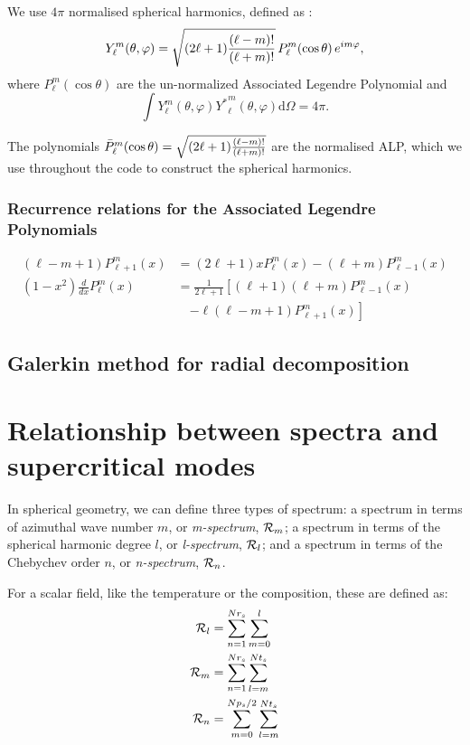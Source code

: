 \documentclass[a4paper,10pt]{book}
\begin{document}
We use $4\pi$ normalised spherical harmonics, defined as :
\begin{equation}
 Y_\ell^m( \theta , \varphi ) =  \sqrt{{(2\ell+1) }{(\ell-m)!\over (\ell+m)!}} \, P_\ell^m ( \cos{\theta} )\, e^{i m \varphi },
\end{equation}
where $P_\ell^m ( \cos{\theta} )$ are the un-normalized Associated Legendre Polynomial
and
\begin{equation}
 \int Y_\ell^m( \theta , \varphi ) {Y^*}_\ell^m( \theta , \varphi ) \mbox{d}\Omega = 4\pi.
\end{equation}

The polynomials $\bar{P}_\ell^m ( \cos{\theta} ) = \sqrt{{(2\ell+1) }{(\ell-m)!\over (\ell+m)!}}$
are the normalised ALP, which we use throughout the code to construct the spherical harmonics.


\subsubsection{Recurrence relations for the Associated Legendre Polynomials}
\begin{align}
 (\ell-m+1)P_{\ell+1}^{m}(x) &= (2\ell+1)xP_{\ell}^{m}(x) - (\ell+m)P_{\ell-1}^{m}(x)\\
 (1-x^2)\frac{d}{dx}{P_\ell^m}(x) &= \frac1{2\ell+1}
  \left[ (\ell+1)(\ell+m)P_{\ell-1}^m(x) \right. \nonumber \\
   &\quad \left. - \ell(\ell-m+1)P_{\ell+1}^m(x) \right]
\end{align}

\subsection{Galerkin method for radial decomposition}

\section{Relationship between spectra and supercritical modes}
\label{s:spectra_defs}
In spherical geometry, we can define three types of spectrum: a spectrum in
terms of azimuthal wave number $m$, or {\em m-spectrum}, ${\cal R}_m$; a
spectrum in terms of the spherical harmonic degree $l$, or {\em l-spectrum},
${\cal R}_l$; and a spectrum in terms of the Chebychev order $n$, or
{\em n-spectrum}, ${\cal R}_n$.

For a scalar field, like the temperature or the composition, these are defined
as:
\begin{align}
{\cal R}_l & = \sum_{n=1}^{Nr_s}\sum_{m=0}^l  \\
{\cal R}_m & = \sum_{n=1}^{Nr_s}\sum_{l=m}^{Nt_s}  \\
{\cal R}_n & = \sum_{m=0}^{Np_s/2}\sum_{l=m}^{Nt_s}
\end{align}
\end{document}
